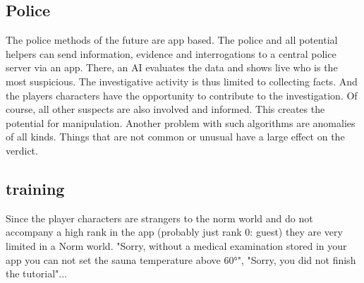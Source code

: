 \subsection{Police}
The police methods of the future are app based. The police and all potential helpers can send information, evidence and interrogations to a central police server via an app. There, an AI evaluates the data and shows live who is the most suspicious. The investigative activity is thus limited to collecting facts. And the players characters have the opportunity to contribute to the investigation. Of course, all other suspects are also involved and informed. This creates the potential for manipulation. Another problem with such algorithms are anomalies of all kinds. Things that are not common or unusual have a large effect on the verdict.

\subsection{training}

Since the player characters are strangers to the norm world and do not accompany a high rank in the app (probably just rank 0: guest) they are very limited in a Norm world. "Sorry, without a medical examination stored in your app you can not set the sauna temperature above 60°", "Sorry, you did not finish the tutorial"...